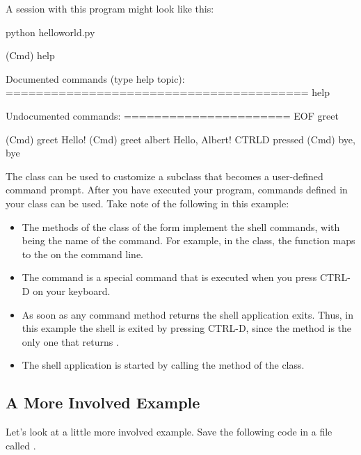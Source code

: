 A session with this program might look like this:

\begin{sphinxVerbatim}[commandchars=\\\{\}]
\PYGZdl{} python helloworld.py

(Cmd) help

Documented commands (type help \PYGZlt{}topic\PYGZgt{}):
========================================
help

Undocumented commands:
======================
EOF  greet

(Cmd) greet
Hello!
(Cmd) greet albert
Hello, Albert!
\PYGZlt{}CTRL\PYGZhy{}D pressed\PYGZgt{}
(Cmd) bye, bye
\end{sphinxVerbatim}

The  class can be used to customize a subclass that becomes a
user-defined command prompt. After you have executed your program,
commands defined in your class can be used. Take note of the
following in this example:
\begin{itemize}
\item {} 
The methods of the class of the form  implement the shell
commands, with  being the name of the command. For example, in
the  class, the function  maps to the 
on the command line.

\item {} 
The  command is a special command that is executed when you
press CTRL-D on your keyboard.

\item {} 
As soon as any command method returns  the shell application
exits. Thus, in this example the shell is exited by pressing CTRL-D,
since the  method is the only one that returns .

\item {} 
The shell application is started by calling the  method of
the class.

\end{itemize}


\subsection{A More Involved Example}
\label{\detokenize{lesson/prg/python_cmd:a-more-involved-example}}
Let's look at a little more involved example. Save the following code
in a file called .

